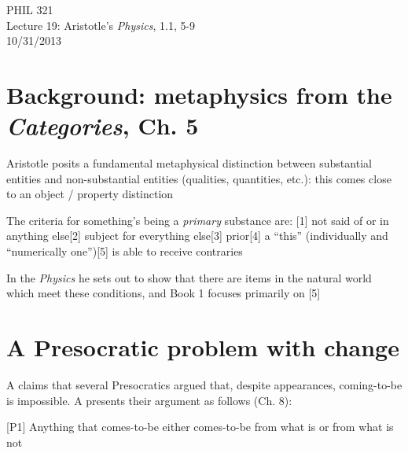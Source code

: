 \documentclass[11pt]{article}
\begin{document}
\thispagestyle{empty}
\begin{center} \LARGE{PHIL 321\\ Lecture 19: Aristotle's \emph{Physics}, 1.1, 5-9}\\ \vspace*{2mm}
\large{10/31/2013}\end{center}
\thispagestyle{empty}\vspace*{3mm}
\vspace*{-8mm}

\section*{Background: metaphysics from the \emph{Categories}, Ch. 5}

\noindent Aristotle posits a fundamental metaphysical distinction between substantial entities and non-substantial entities (qualities, quantities, etc.): this comes close to an object / property distinction
\vspace*{2mm}

\noindent The criteria for something's being a \emph{primary} substance are: [1] not said of or in anything else\hspace*{3mm}[2] subject for everything else\hspace*{3mm}[3] prior\hspace*{3mm}[4] a ``this'' (individually and ``numerically one'')\hspace*{3mm}[5] is able to receive contraries
\vspace*{2mm}

\noindent In the \emph{Physics} he sets out to show that there are items in the natural world which meet these conditions, and Book 1 focuses primarily on [5]
\vspace*{-3mm}

\section*{A Presocratic problem with change}

\noindent A claims that several Presocratics argued that, despite appearances, coming-to-be is impossible. A presents their argument as follows (Ch. 8):
\vspace*{2mm}

[P1] Anything that comes-to-be either comes-to-be from what is or from what is not
\vspace*{1mm}
\end{document}
